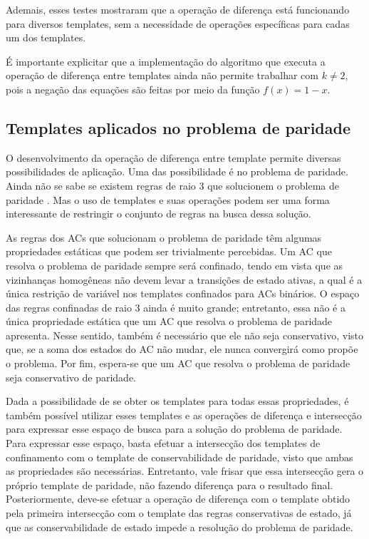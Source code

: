 Ademais, esses testes mostraram que a operação de diferença está funcionando para diversos templates, sem a necessidade de operações específicas para cadas um dos templates.

É importante explicitar que a implementação do algoritmo que executa a operação de diferença entre templates ainda não permite trabalhar com $k\neq 2$, pois a negação das equações são feitas por meio da função $f(x) = 1 - x$.

\subsection{Templates aplicados no problema de paridade}
O desenvolvimento da operação de diferença entre template permite diversas possibilidades de aplicação.
Uma das possibilidade é no problema de paridade. 
Ainda não se sabe se existem regras de raio 3 que solucionem o problema de paridade \cite{Betel2013}. 
Mas o uso de templates e suas operações podem ser uma forma interessante de restringir o conjunto de regras na busca dessa solução.

As regras dos ACs que solucionam o problema de paridade têm algumas propriedades estáticas que podem ser trivialmente percebidas. 
Um AC que resolva o problema de paridade sempre será confinado, tendo em vista que as vizinhanças homogêneas não devem levar a transições de estado ativas, a qual é a única restrição de variável nos templates confinados para ACs binários. 
O espaço das regras confinadas de raio 3 ainda é muito grande; entretanto, essa não é a única propriedade estática que um AC que resolva o problema de paridade apresenta.  Nesse sentido, também é necessário que ele não seja conservativo, visto que, se a soma dos estados do AC não mudar, ele nunca convergirá como propõe o problema. 
Por fim, espera-se que um AC que resolva o problema de paridade seja conservativo de paridade.

Dada a possibilidade de se obter os templates para todas essas propriedades, é também possível utilizar esses templates e as operações de diferença e intersecção para expressar esse espaço de busca para a solução do problema de paridade.
Para expressar esse espaço, basta efetuar a intersecção dos templates de confinamento com o template de conservabilidade de paridade, visto que ambas as propriedades são necessárias. Entretanto, vale frisar que essa intersecção gera o próprio template de paridade, não fazendo diferença para o resultado final.
Posteriormente, deve-se efetuar a operação de diferença com o template obtido pela primeira intersecção com o template das regras conservativas de estado, já que as conservabilidade de estado impede a resolução do problema de paridade.

